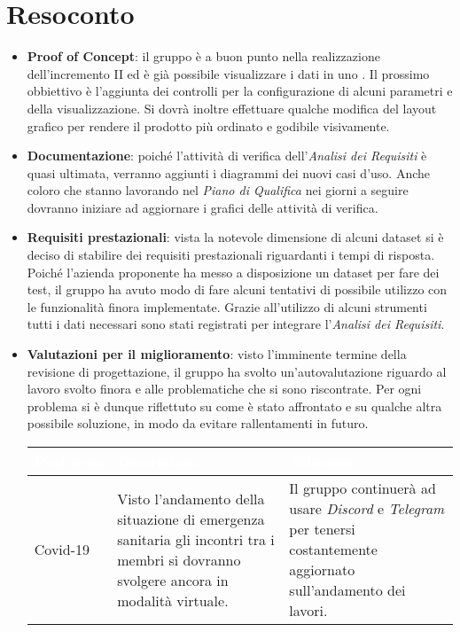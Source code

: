 \section{Resoconto}
\begin{itemize}
\item \textbf{Proof of Concept}: il gruppo è a buon punto nella realizzazione dell'incremento II ed è già possibile visualizzare i dati in uno . Il prossimo obbiettivo è l'aggiunta dei controlli per la configurazione di alcuni parametri e della visualizzazione. Si dovrà inoltre effettuare qualche modifica del layout grafico per rendere il prodotto più ordinato e godibile visivamente. 

\item\textbf{Documentazione}: poiché l'attività di verifica dell'\textit{Analisi dei Requisiti} è quasi ultimata, verranno aggiunti i diagrammi dei nuovi casi d'uso. Anche coloro che stanno lavorando nel \textit{Piano di Qualifica} nei giorni a seguire dovranno iniziare ad aggiornare i grafici delle attività di verifica.

\item \textbf{Requisiti prestazionali}: vista la notevole dimensione di alcuni dataset si è deciso di stabilire dei requisiti prestazionali riguardanti i tempi di risposta. Poiché l'azienda proponente ha messo a disposizione un dataset per fare dei test, il gruppo ha avuto modo di fare alcuni tentativi di possibile utilizzo con le funzionalità finora implementate. Grazie all'utilizzo di alcuni strumenti tutti i dati necessari sono stati registrati per integrare l'\textit{Analisi dei Requisiti}.

\item\textbf{Valutazioni per il miglioramento}: visto l'imminente termine della revisione di progettazione, il gruppo ha svolto un'autovalutazione riguardo al lavoro svolto finora e alle problematiche che si sono riscontrate. Per ogni problema si è dunque riflettuto su come è stato affrontato e su qualche altra possibile soluzione, in modo da evitare rallentamenti in futuro.

\renewcommand{\arraystretch}{1.5}
\centering
\begin{longtable}{C{3cm} C{6cm} C{6cm}}
\textcolor{white}{\textbf{Problema}} &
\textcolor{white}{\textbf{Descrizione}} &	
\textcolor{white}{\textbf{Soluzione}} \\	
\endhead

Covid-19 &
Visto l'andamento della situazione di emergenza sanitaria gli incontri tra i membri si dovranno svolgere ancora in modalità virtuale.&
Il gruppo continuerà ad usare \textit{Discord} e \textit{Telegram} per tenersi costantemente aggiornato sull'andamento dei lavori. \\


\end{longtable}
\end{itemize}
